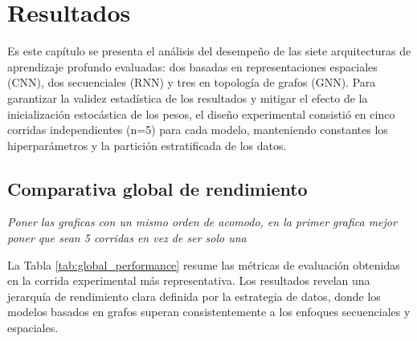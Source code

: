 \documentclass[review,12pt,times,number]{elsarticle}
\begin{document}
\section{Resultados}
Es este capítulo se presenta el análisis del desempeño de las siete arquitecturas de aprendizaje profundo evaluadas: dos basadas en representaciones espaciales (CNN), dos secuenciales (RNN) y tres en topología de grafos (GNN). Para garantizar la validez estadística de los resultados y mitigar el efecto de la inicialización estocástica de los pesos, el diseño experimental consistió en cinco corridas independientes (n=5) para cada modelo, manteniendo constantes los hiperparámetros y la partición estratificada de los datos.

\subsection{Comparativa global de rendimiento}

\textit{Poner las graficas con un mismo orden de acomodo, en la primer grafica mejor poner que sean 5 corridas en vez de ser solo una}

La Tabla \ref{tab:global_performance} resume las métricas de evaluación obtenidas en la corrida experimental más representativa. Los resultados revelan una jerarquía de rendimiento clara definida por la estrategia de datos, donde los modelos basados en grafos superan consistentemente a los enfoques secuenciales y espaciales.
\end{document}
